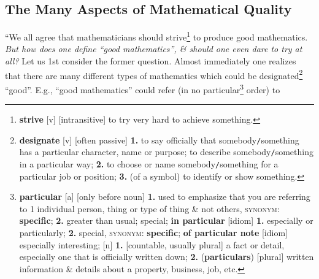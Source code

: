 \documentclass[oneside]{book}
\numberwithin{equation}{section}
\begin{document}
\subsection{The Many Aspects of Mathematical Quality}
``We all agree that mathematicians should strive\footnote{\textbf{strive} [v] [intransitive] to try very hard to achieve something.} to produce good mathematics. \textit{But how does one define ``good mathematics'', \& should one even dare to try at all?} Let us 1st consider the former question. Almost immediately one realizes that there are many different types of mathematics which could be designated\footnote{\textbf{designate} [v] [often passive] \textbf{1.} to say officially that somebody\texttt{/}something has a particular character, name or purpose; to describe somebody\texttt{/}something in a particular way; \textbf{2.} to choose or name somebody\texttt{/}something for a particular job or position; \textbf{3.} (of a symbol) to identify or show something.} ``good''. E.g., ``good mathematics'' could refer (in no particular\footnote{\textbf{particular} [a] [only before noun] \textbf{1.} used to emphasize that you are referring to 1 individual person, thing or type of thing \& not others, \textsc{synonym}: \textbf{specific}; \textbf{2.} greater than usual; special; \textbf{in particular} [idiom] \textbf{1.} especially or particularly; \textbf{2.} special, \textsc{synonym}: \textbf{specific}; \textbf{of particular note} [idiom] especially interesting; [n] \textbf{1.} [countable, usually plural] a fact or detail, especially one that is officially written down; \textbf{2.} (\textbf{particulars}) [plural] written information \& details about a property, business, job, etc.} order) to
\end{document}
